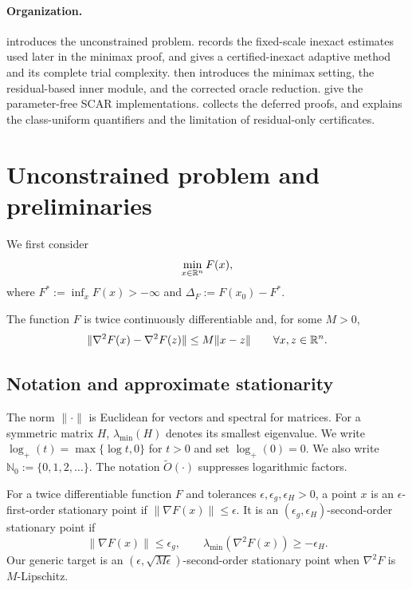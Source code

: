 \documentclass{article}
\begin{document}
\paragraph{Organization.}
 introduces the unconstrained problem.
 records the fixed-scale inexact estimates used
later in the minimax proof, and
 gives a certified-inexact adaptive method and
its complete trial complexity.   then introduces the
minimax setting, the residual-based inner module, and the corrected
oracle reduction.  
give the parameter-free SCAR implementations.
 collects the deferred proofs, and
 explains the class-uniform quantifiers
and the limitation of residual-only certificates.

\section{Unconstrained problem and preliminaries}
\label{sec:preliminaries}

We first consider
\begin{equation}\label{eq:generic-problem}
 \min_{x\in\mathbb{R}^n}F(x),
\end{equation}
where $F^*:=\inf_xF(x)>-\infty$ and
$\Delta_F:=F(x_0)-F^*$.

\begin{assumption}\label{ass:generic}
The function $F$ is twice continuously differentiable and, for some
$M>0$,
\begin{equation}\label{eq:hessian-lipschitz}
 \|\nabla^2F(x)-\nabla^2F(z)\|
 \le M\|x-z\|
 \qquad\forall x,z\in\mathbb{R}^n.
\end{equation}
\end{assumption}

\subsection{Notation and approximate stationarity}

The norm $\|\cdot\|$ is Euclidean for vectors and spectral for matrices.
For a symmetric matrix $H$, $\lambda_{\min}(H)$ denotes its smallest
eigenvalue.  We write
$\log_+(t)=\max\{\log t,0\}$ for $t>0$ and set $\log_+(0)=0$.
We also write $\mathbb N_0:=\{0,1,2,\ldots\}$.
The notation $\widetilde O(\cdot)$ suppresses logarithmic factors.

\begin{definition}\label{def:stationarity}
For a twice differentiable function $F$ and tolerances
$\epsilon,\epsilon_g,\epsilon_H>0$, a point $x$ is an
$\epsilon$-first-order stationary point if
$\|\nabla F(x)\|\le\epsilon$.  It is an
$(\epsilon_g,\epsilon_H)$-second-order stationary point if
\[
 \|\nabla F(x)\|\le\epsilon_g,
 \qquad
 \lambda_{\min}(\nabla^2F(x))\ge-\epsilon_H.
\]
Our generic target is an
$(\epsilon,\sqrt{M\epsilon})$-second-order stationary point when
$\nabla^2F$ is $M$-Lipschitz.
\end{definition}
\end{document}
